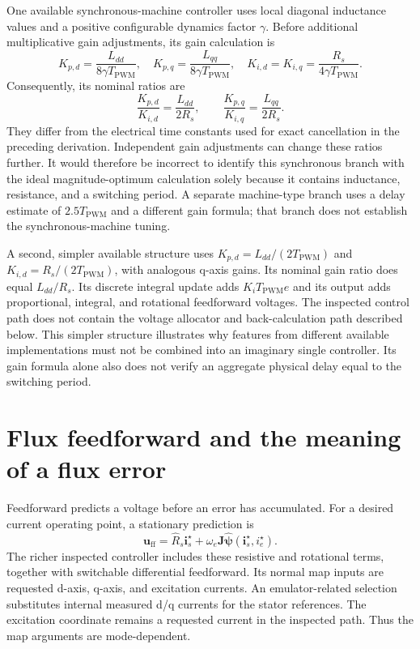 One available synchronous-machine controller uses local diagonal inductance values and a positive configurable dynamics factor $\gamma$. Before additional multiplicative gain adjustments, its gain calculation is
\begin{equation}
 K_{p,d}=\frac{L_{dd}}{8\gamma T_{\mathrm{PWM}}},
 \quad K_{p,q}=\frac{L_{qq}}{8\gamma T_{\mathrm{PWM}}},
 \quad K_{i,d}=K_{i,q}=\frac{R_s}{4\gamma T_{\mathrm{PWM}}}.
 \label{eq:control-inspected-gains}
\end{equation}
Consequently, its nominal ratios are
\begin{equation}
 \frac{K_{p,d}}{K_{i,d}}=\frac{L_{dd}}{2R_s},
 \qquad
 \frac{K_{p,q}}{K_{i,q}}=\frac{L_{qq}}{2R_s}.
\end{equation}
They differ from the electrical time constants used for exact cancellation in the preceding derivation. Independent gain adjustments can change these ratios further. It would therefore be incorrect to identify this synchronous branch with the ideal magnitude-optimum calculation solely because it contains inductance, resistance, and a switching period. A separate machine-type branch uses a delay estimate of $2.5T_{\mathrm{PWM}}$ and a different gain formula; that branch does not establish the synchronous-machine tuning.

A second, simpler available structure uses $K_{p,d}=L_{dd}/(2T_{\mathrm{PWM}})$ and $K_{i,d}=R_s/(2T_{\mathrm{PWM}})$, with analogous q-axis gains. Its nominal gain ratio does equal $L_{dd}/R_s$. Its discrete integral update adds $K_iT_{\mathrm{PWM}}e$ and its output adds proportional, integral, and rotational feedforward voltages. The inspected control path does not contain the voltage allocator and back-calculation path described below. This simpler structure illustrates why features from different available implementations must not be combined into an imaginary single controller. Its gain formula alone also does not verify an aggregate physical delay equal to the switching period.

\section{Flux feedforward and the meaning of a flux error}

Feedforward predicts a voltage before an error has accumulated. For a desired current operating point, a stationary prediction is
\begin{equation}
 \bm u_{\mathrm{ff}}=
 \widehat R_s\bm i_s^\star+
 \omega_e\bm J\widehat{\bm\psi}(\bm i_s^\star,i_e^\star).
 \label{eq:control-stationary-ff}
\end{equation}
The richer inspected controller includes these resistive and rotational terms, together with switchable differential feedforward. Its normal map inputs are requested d-axis, q-axis, and excitation currents. An emulator-related selection substitutes internal measured d/q currents for the stator references. The excitation coordinate remains a requested current in the inspected path. Thus the map arguments are mode-dependent.

